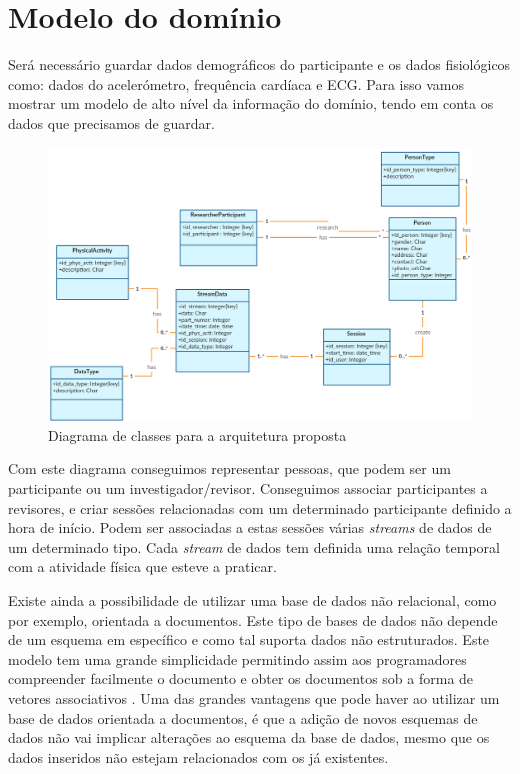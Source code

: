 \section{Modelo do domínio}
Será necessário guardar dados demográficos do participante e os dados fisiológicos como: dados do acelerómetro, frequência cardíaca e \gls{ECG}. Para isso vamos mostrar um modelo de alto nível da informação do domínio, tendo em conta os dados que precisamos de guardar.

\begin{figure}[H]
  \centering
  \includegraphics[width=1\textwidth]{imgs/class-diagram.png}
  \caption[Diagrama de classes para a arquitetura proposta]{Diagrama de classes para a arquitetura proposta}
  
  \label{f:class-diagram}
\end{figure}

Com este diagrama conseguimos representar pessoas, que podem ser um participante ou um investigador/revisor. Conseguimos associar participantes a revisores, e criar sessões relacionadas com um determinado participante definido a hora de início. Podem ser associadas a estas sessões várias \textit{streams} de dados de um determinado tipo. Cada \textit{stream} de dados tem definida uma relação temporal com a atividade física que esteve a praticar.
\par 
Existe ainda a possibilidade de utilizar uma base de dados não relacional, como por exemplo, orientada a documentos. Este tipo de bases de dados não depende de um esquema em específico e como tal suporta dados não estruturados. Este modelo tem uma grande simplicidade permitindo assim aos programadores compreender facilmente o documento e obter os documentos sob a forma de vetores associativos \cite{nosql}. Uma das grandes vantagens que pode haver ao utilizar um base de dados orientada a documentos, é que a adição de novos esquemas de dados não vai implicar alterações ao esquema da base de dados, mesmo que os dados inseridos não estejam relacionados com os já existentes.





